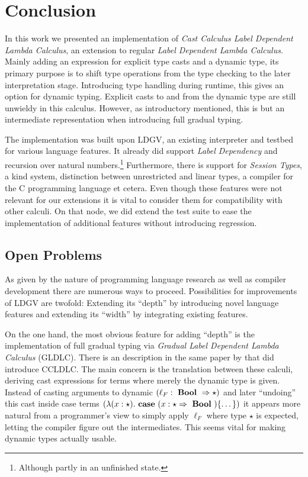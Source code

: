 \chapter{Conclusion}\label{chap:conclusion}

In this work we presented an implementation of \emph{Cast Calculus Label Dependent Lambda Calculus}, an extension to regular \emph{Label Dependent Lambda Calculus}. Mainly adding an expression for explicit type casts and a dynamic type, its primary purpose is to shift type operations from the type checking to the later interpretation stage. Introducing type handling during runtime, this gives an option for dynamic typing. Explicit casts to and from the dynamic type are still unwieldy in this calculus. However, as introductory mentioned, this is but an intermediate representation when introducing full gradual typing.

The implementation was built upon LDGV, an existing interpreter and testbed for various language features. It already did support \emph{Label Dependency} and recursion over natural numbers.\footnote{Although partly in an unfinished state.} Furthermore, there is support for \emph{Session Types}, a kind system, distinction between unrestricted and linear types, a compiler for the C programming language et cetera. Even though these features were not relevant for our extensions it is vital to consider them for compatibility with other calculi. On that node, we did extend the test suite to ease the implementation of additional features without introducing regression.

\section{Open Problems}

As given by the nature of programming language research as well as compiler development there are numerous ways to proceed. Possibilities for improvements of LDGV are twofold: Extending its ``depth'' by introducing novel language features and extending its ``width'' by integrating existing features.

On the one hand, the most obvious feature for adding ``depth'' is the implementation of full gradual typing via \emph{Gradual Label Dependent Lambda Calculus} (GLDLC). There is an description in the same paper by \cite{fu2021} that did introduce CCLDLC. The main concern is the translation between these calculi, deriving cast expressions for terms where merely the dynamic type is given. Instead of casting arguments to dynamic $(\ell_F: \text{ \textbf{Bool} } \Rightarrow \star)$ and later ``undoing'' this cast inside case terms $(\lambda(x:\star) . \text{ \textbf{case} } (x : \star \Rightarrow \text{ \textbf{Bool} }) \{\dots\})$ it appears more natural from a programmer's view to simply apply $\ell_F$ where type $\star$ is expected, letting the compiler figure out the intermediates. This seems vital for making dynamic types actually usable.

